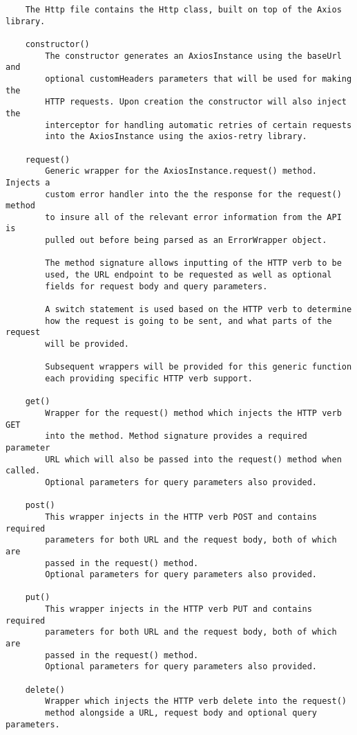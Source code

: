 \begin{verbatim}
    The Http file contains the Http class, built on top of the Axios library. 
    
    constructor()
        The constructor generates an AxiosInstance using the baseUrl and 
        optional customHeaders parameters that will be used for making the 
        HTTP requests. Upon creation the constructor will also inject the 
        interceptor for handling automatic retries of certain requests 
        into the AxiosInstance using the axios-retry library.
        
    request()
        Generic wrapper for the AxiosInstance.request() method. Injects a 
        custom error handler into the the response for the request() method 
        to insure all of the relevant error information from the API is 
        pulled out before being parsed as an ErrorWrapper object.
        
        The method signature allows inputting of the HTTP verb to be
        used, the URL endpoint to be requested as well as optional 
        fields for request body and query parameters.
        
        A switch statement is used based on the HTTP verb to determine
        how the request is going to be sent, and what parts of the request
        will be provided.
        
        Subsequent wrappers will be provided for this generic function
        each providing specific HTTP verb support.
        
    get()
        Wrapper for the request() method which injects the HTTP verb GET 
        into the method. Method signature provides a required parameter
        URL which will also be passed into the request() method when called.
        Optional parameters for query parameters also provided.
    
    post()
        This wrapper injects in the HTTP verb POST and contains required
        parameters for both URL and the request body, both of which are
        passed in the request() method.
        Optional parameters for query parameters also provided.
    
    put()
        This wrapper injects in the HTTP verb PUT and contains required
        parameters for both URL and the request body, both of which are
        passed in the request() method.
        Optional parameters for query parameters also provided.
    
    delete()
        Wrapper which injects the HTTP verb delete into the request()
        method alongside a URL, request body and optional query parameters.
        
\end{verbatim}
